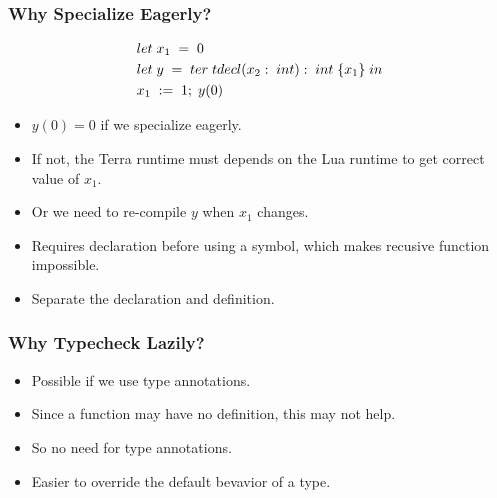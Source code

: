 \documentclass{beamer}
\begin{document}
\begin{frame}
	\frametitle{Why Specialize Eagerly?}
  \begin{equation*}
    \begin{split}
      & let \thickspace x_1\thickspace =\thickspace 0 \\
      & let \thickspace y\thickspace =\thickspace ter\thickspace tdecl(x_2:\thickspace int):\thickspace int\thickspace \{x_1\}\thickspace in \\
      & x_1\thickspace :=\thickspace 1;\thickspace y(0)
    \end{split}
  \end{equation*} \pause
  \newline
  \begin{itemize}
  \item $y(0) = 0$ if we specialize eagerly.\pause
  \item If not, the Terra runtime must depends on the Lua runtime to get correct value of $x_1$.\pause
  \item Or we need to re-compile $y$ when $x_1$ changes.\pause
  \item Requires declaration before using a symbol, which makes recusive function impossible.\pause
  \item Separate the declaration and definition.
  \end{itemize}
\end{frame}

\begin{frame}
	\frametitle{Why Typecheck Lazily?}
  \begin{itemize}
  \item Possible if we use type annotations.\pause
  \item Since a function may have no definition, this may not help.\pause
  \item So no need for type annotations.\pause
  \item Easier to override the default bevavior of a type.
  \end{itemize}
\end{frame}
\end{document}

